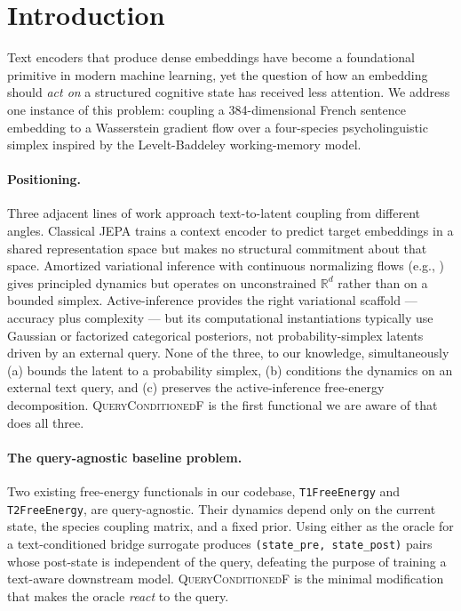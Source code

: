 \section{Introduction}
\label{sec:intro}

Text encoders that produce dense embeddings have become a foundational
primitive in modern machine learning, yet the question of how an
embedding should \emph{act on} a structured cognitive state has
received less attention. We address one instance of this problem:
coupling a 384-dimensional French sentence embedding to a Wasserstein
gradient flow over a four-species psycholinguistic simplex inspired
by the Levelt-Baddeley working-memory model.

\paragraph{Positioning.} Three adjacent lines of work approach
text-to-latent coupling from different angles. Classical JEPA
\citep{lecun2022} trains a context encoder to predict target
embeddings in a shared representation space but makes no structural
commitment about that space. Amortized variational inference with
continuous normalizing flows (e.g., \citealp{chen2018neural}) gives
principled dynamics but operates on unconstrained $\mathbb{R}^d$
rather than on a bounded simplex. Active-inference
\citep{friston2010,parr2017} provides the right variational
scaffold --- accuracy plus complexity --- but its computational
instantiations typically use Gaussian or factorized categorical
posteriors, not probability-simplex latents driven by an
external query. None of the three, to our knowledge, simultaneously
(a) bounds the latent to a probability simplex, (b) conditions
the dynamics on an external text query, and (c) preserves the
active-inference free-energy decomposition. \textsc{QueryConditionedF}
is the first functional we are aware of that does all three.

\paragraph{The query-agnostic baseline problem.} Two existing
free-energy functionals in our codebase, \texttt{T1FreeEnergy} and
\texttt{T2FreeEnergy}, are query-agnostic. Their dynamics depend
only on the current state, the species coupling matrix, and a fixed
prior. Using either as the oracle for a text-conditioned bridge
surrogate produces \texttt{(state\_pre, state\_post)} pairs whose
post-state is independent of the query, defeating the purpose of
training a text-aware downstream model. \textsc{QueryConditionedF}
is the minimal modification that makes the oracle \emph{react}
to the query.

